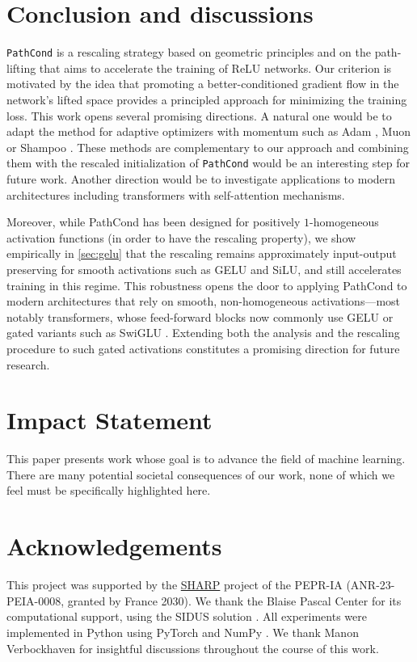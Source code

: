 \documentclass{article}
\theoremstyle{plain}
\theoremstyle{definition}
\theoremstyle{remark}
\def\pathcond{{\texttt{PathCond} }}
\begin{document}
{ 
\section{Conclusion and discussions}

\pathcond is a rescaling strategy based on geometric principles and on the path-lifting that aims to accelerate 
the training of ReLU networks. 
Our criterion is motivated by the idea that promoting a better-conditioned gradient flow in the network's lifted space 
provides a principled approach for minimizing the training loss.
This work opens several promising directions. 
A natural one would be to adapt the method for adaptive optimizers with momentum such as Adam \citep{kingma2014adam}, Muon \citep{jordan2024muon} or Shampoo \citep{gupta2018shampoo}. 
These methods are complementary to our approach and combining them with the rescaled initialization of \pathcond would be an interesting step for future work.
Another direction would be to investigate applications to modern architectures including transformers with self-attention mechanisms.

Moreover, while PathCond has been designed for positively $1$-homogeneous activation functions (in order to have the rescaling property), we show empirically in \cref{sec:gelu} that the rescaling remains approximately input-output preserving for smooth activations such as GELU and SiLU, and still accelerates training in this regime. This robustness opens the door to applying PathCond to modern architectures that rely on smooth, non-homogeneous activations—most notably transformers, whose feed-forward blocks now commonly use GELU or gated variants such as SwiGLU \citep{shazeer2020glu}. Extending both the analysis and the rescaling procedure to such gated activations constitutes a promising direction for future research. 
\newpage
\section*{Impact Statement}

This paper presents work whose goal is to advance the field of machine learning. There are many potential societal consequences of our work, none of which we feel must be specifically highlighted here.


\section*{Acknowledgements}
This project was supported by the \href{https://www.pepr-ia.fr/en/projet/sharp-english/}{SHARP} project of the PEPR-IA (ANR-23-PEIA-0008, granted by France 2030).
We thank the Blaise Pascal Center for its computational support, using the SIDUS solution \citep{quemener2013sidus}.
All experiments were implemented in Python using PyTorch \citep{paszke2019pytorch} and NumPy \citep{harris2020array}.
We thank Manon Verbockhaven for insightful discussions throughout the course of this work.



}
\end{document}
